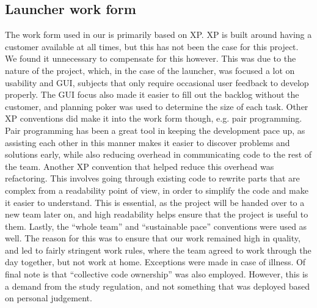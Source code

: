 \subsection{Launcher work form}
The work form used in our \localgroup{} is primarily based on XP. 
XP is built around having a customer available at all times, but this has not been the case for this project. 
We found it unnecessary to compensate for this however. 
This was due to the nature of the project, which, in the case of the launcher, was focused a lot on usability and GUI, subjects that only require occasional user feedback to develop properly. 
The GUI focus also made it easier to fill out the backlog without the customer, and planning poker was used to determine the size of each task. \newline
Other XP conventions did make it into the work form though, e.g. pair programming. 
Pair programming has been a great tool in keeping the development pace up, as assisting each other in this manner makes it easier to discover problems and solutions early, while also reducing overhead in communicating code to the rest of the team. \newline
Another XP convention that helped reduce this overhead was refactoring. 
This involves going through existing code to rewrite parts that are complex from a readability point of view, in order to simplify the code and make it easier to understand. 
This is essential, as the project will be handed over to a new team later on, and high readability helps ensure that the project is useful to them. \newline
Lastly, the \textquotedblleft{}whole team\textquotedblright{} and \textquotedblleft{}sustainable pace\textquotedblright{} conventions were used as well. 
The reason for this was to ensure that our work remained high in quality, and led to fairly stringent work rules, where the team agreed to work through the day together, but not work at home. 
Exceptions were made in case of illness. \newline
Of final note is that \textquotedblleft{}collective code ownership\textquotedblright{} was also employed. 
However, this is a demand from the study regulation, and not something that was deployed based on personal judgement. 
